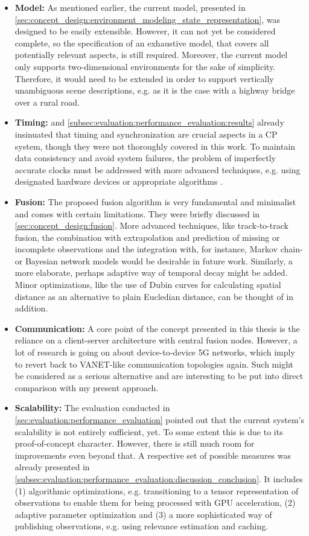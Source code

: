 \begin{itemize}
	\item \textbf{Model:} As mentioned earlier, the current model, presented in \cref{sec:concept_design:environment_modeling_state_representation}, was designed to be easily extensible. However, it can not yet be considered complete, so the specification of an exhaustive model, that covers all potentially relevant aspects, is still required. Moreover, the current model only supports two-dimensional environments for the sake of simplicity. Therefore, it would need to be extended in order to support vertically unambiguous scene descriptions, e.g. as it is the case with a highway bridge over a rural road. 
	\item \textbf{Timing:}  and \cref{subsec:evaluation:performance_evaluation:results} already insinuated that timing and synchronization are crucial aspects in a CP system, though they were not thoroughly covered in this work. To maintain data consistency and avoid system failures, the problem of imperfectly accurate clocks must be addressed with more advanced techniques, e.g. using designated hardware devices \cite{Rauch2011} or appropriate algorithms \cite{Julier}. 
	\item \textbf{Fusion:} The proposed fusion algorithm is very fundamental and minimalist and comes with certain limitations. They were briefly discussed in \cref{sec:concept_design:fusion}. More advanced techniques, like track-to-track fusion, the combination with extrapolation and prediction of missing or incomplete observations and the integration with, for instance, Markov chain- or Bayesian network models would be desirable in future work. Similarly, a more elaborate, perhaps adaptive way of temporal decay might be added. Minor optimizations, like the use of Dubin curves for calculating spatial distance as an alternative to plain Eucledian distance, can be thought of in addition. 
	\item \textbf{Communication:} A core point of the concept presented in this thesis is the reliance on a client-server architecture with central fusion nodes. However, a lot of research is going on about device-to-device 5G networks, which imply to revert back to VANET-like communication topologies again. Such might be considered as a serious alternative and are interesting to be put into direct comparison with my present approach. 
	\item \textbf{Scalability:} The evaluation conducted in \cref{sec:evaluation:performance_evaluation} pointed out that the current system's scalability is not entirely sufficient, yet. To some extent this is due to its proof-of-concept character. However, there is still much room for improvements even beyond that. A respective set of possible measures was already presented in \cref{subsec:evaluation:performance_evaluation:discussion_conclusion}. It includes (1) algorithmic optimizations, e.g. transitioning to a tensor representation of observations to enable them for being processed with GPU acceleration, (2) adaptive parameter optimization and (3) a more sophisticated way of publishing observations, e.g. using relevance estimation \cite{Breu2013} and caching. 

\end{itemize}
